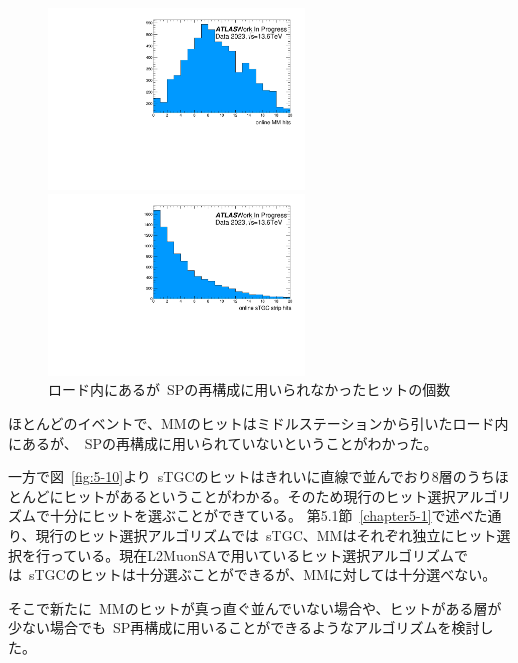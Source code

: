 \begin{figure}[H]
  \begin{minipage}[b]{0.48\linewidth}
      \centering
      \includegraphics[clip, width=6.8cm]{fig/5/data_onlinemmIsoutlier.pdf}
  \end{minipage}
    \begin{minipage}[b]{0.48\linewidth}
      \centering
      \includegraphics[clip, width=6.8cm]{fig/5/data_onlinestgcetaIsoutlier.pdf}
  \end{minipage}
  \caption{ロード内にあるが~SPの再構成に用いられなかったヒットの個数}\label{fig:5-11}
\end{figure}

ほとんどのイベントで、MMのヒットはミドルステーションから引いたロード内にあるが、~SPの再構成に用いられていないということがわかった。

一方で図~\ref{fig:5-10}より~sTGCのヒットはきれいに直線で並んでおり8層のうちほとんどにヒットがあるということがわかる。そのため現行のヒット選択アルゴリズムで十分にヒットを選ぶことができている。
第5.1節~\ref{chapter5-1}で述べた通り、現行のヒット選択アルゴリズムでは~sTGC、MMはそれぞれ独立にヒット選択を行っている。現在L2MuonSAで用いているヒット選択アルゴリズムでは~sTGCのヒットは十分選ぶことができるが、MMに対しては十分選べない。

そこで新たに~MMのヒットが真っ直ぐ並んでいない場合や、ヒットがある層が少ない場合でも~SP再構成に用いることができるようなアルゴリズムを検討した。

